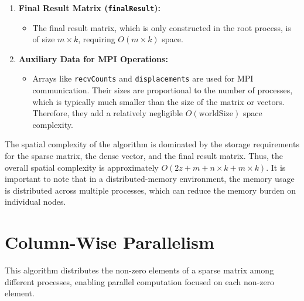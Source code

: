 \documentclass[12pt,oneside]{book} %
\begin{document}
\begin{enumerate}
    \item \textbf{Final Result Matrix (\texttt{finalResult}):}
          \begin{itemize}
              \item The final result matrix, which is only constructed in the root process, is of
                    size \( m \times k \), requiring \( O(m \times k) \) space.
          \end{itemize}

    \item \textbf{Auxiliary Data for MPI Operations:}
          \begin{itemize}
              \item Arrays like \texttt{recvCounts} and \texttt{displacements} are used for MPI
                    communication. Their sizes are proportional to the number of processes, which
                    is typically much smaller than the size of the matrix or vectors. Therefore,
                    they add a relatively negligible \( O(\text{worldSize}) \) space complexity.
          \end{itemize}
\end{enumerate}

The spatial complexity of the algorithm is dominated by the storage
requirements for the sparse matrix, the dense vector, and the final result
matrix. Thus, the overall spatial complexity is approximately \( O(2z + m + n
\times k + m \times k) \). It is important to note that in a distributed-memory
environment, the memory usage is distributed across multiple processes, which
can reduce the memory burden on individual nodes.

\newpage
\section{Column-Wise Parallelism}
This algorithm distributes the non-zero elements of a sparse matrix among
different processes, enabling parallel computation focused on each non-zero
element.
\end{document}
